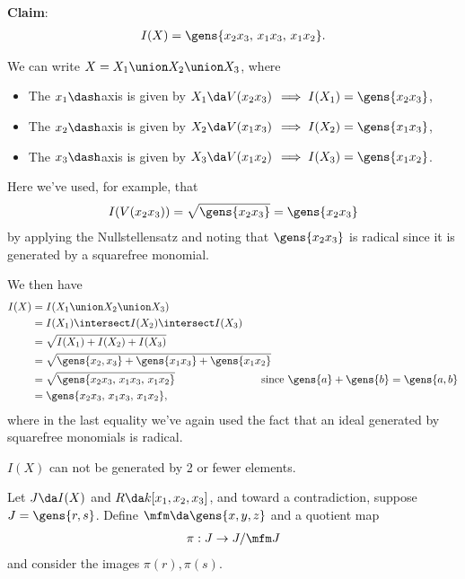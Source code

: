 \begin{solution}

\textbf{Claim}:
\begin{align*}I(X) = \gens{x_2 x_3,\, x_1 x_3,\, x_1 x_2}.\end{align*}

We can write \(X = X_1 \union X_2 \union X_3\), where

\begin{itemize}
\tightlist
\item
  The \(x_1\dash\)axis is given by \(X_1 \da V(x_2 x_3)\)
  \(\implies I(X_1) = \gens{x_2 x_3}\),
\item
  The \(x_2\dash\)axis is given by \(X_2 \da V(x_1 x_3)\)
  \(\implies I(X_2) = \gens{x_1 x_3}\),
\item
  The \(x_3\dash\)axis is given by \(X_3 \da V(x_1 x_2)\)
  \(\implies I(X_3) = \gens{x_1 x_2}\).
\end{itemize}

Here we've used, for example, that
\begin{align*}I(V(x_2 x_3)) = \sqrt{\gens{x_2 x_3}} = \gens{x_2 x_3}\end{align*}
by applying the Nullstellensatz and noting that \(\gens{x_2x_3}\) is
radical since it is generated by a squarefree monomial.

We then have
\begin{align*}  
I(X) &= I(X_1 \union X_2 \union X_3) \\
&= I(X_1) \intersect I(X_2) \intersect I(X_3) \\
&= \sqrt{I(X_1) + I(X_2) + I(X_3)} \\
&= \sqrt{\gens{x_2, x_3} + \gens{x_1 x_3} + \gens{x_1 x_2}} \\
&= \sqrt{\gens{x_2x_3,\, x_1 x_3,\, x_1 x_2}} \hspace{8em}\text{since } \gens{a} + \gens{b} = \gens{a, b} \\
&= {\gens{x_2x_3,\, x_1 x_3,\, x_1 x_2}}
,\end{align*} where in the last equality we've again used the fact that
an ideal generated by squarefree monomials is radical.

\begin{claim}

\(I(X)\) can not be generated by 2 or fewer elements.

Let \(J\da I(X)\) and \(R\da k[x_1, x_2, x_3]\), and toward a
contradiction, suppose \(J = \gens{r, s}\). Define
\(\mfm \da \gens{x, y, z}\) and a quotient map
\begin{align*}\pi: J \to J/\mfm J\end{align*} and consider the images
\(\pi(r), \pi(s)\).


\end{claim}
\end{solution}
